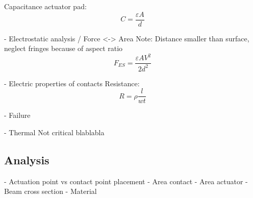 Capacitance actuator pad:
\begin{equation}
	C = \frac{\varepsilon A}{d}
	\label{eq:plate_capacitor}
\end{equation}

- Electrostatic analysis / Force <-> Area
Note: Distance smaller than surface, neglect fringes because of aspect ratio
\begin{equation}
	F_{ES} = \frac{\varepsilon AV^2}{2d^2}
	\label{eq:electrostatic_force}
\end{equation}

- Electric properties of contacts
Resistance:
\begin{equation}
	R = \rho\frac{l}{wt}
	\label{eq:resistance}
\end{equation}

- Failure

- Thermal
Not critical blablabla 

\subsection{Analysis}
\label{sec:analysis}
- Actuation point vs contact point placement
- Area contact
- Area actuator
- Beam cross section
- Material
